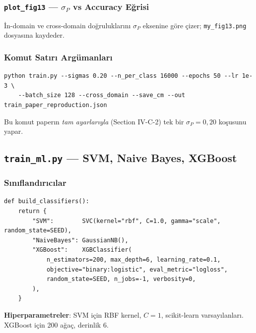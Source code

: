 \documentclass[11pt,a4paper]{article}
\begin{document}
\subsubsection{\texttt{plot\_fig13} — $\sigma_P$ vs Accuracy Eğrisi}
İn-domain ve cross-domain doğruluklarını $\sigma_P$ eksenine göre çizer; \texttt{my\_fig13.png}
dosyasına kaydeder.

\subsubsection{Komut Satırı Argümanları}
\begin{lstlisting}
python train.py --sigmas 0.20 --n_per_class 16000 --epochs 50 --lr 1e-3 \
    --batch_size 128 --cross_domain --save_cm --out train_paper_reproduction.json
\end{lstlisting}
Bu komut paperın \emph{tam ayarlarıyla} (Section IV-C-2) tek bir $\sigma_P=0{,}20$ koşusunu yapar.

\subsection{\texttt{train\_ml.py} — SVM, Naive Bayes, XGBoost}
\subsubsection{Sınıflandırıcılar}
\begin{lstlisting}
def build_classifiers():
    return {
        "SVM":        SVC(kernel="rbf", C=1.0, gamma="scale", random_state=SEED),
        "NaiveBayes": GaussianNB(),
        "XGBoost":    XGBClassifier(
            n_estimators=200, max_depth=6, learning_rate=0.1,
            objective="binary:logistic", eval_metric="logloss",
            random_state=SEED, n_jobs=-1, verbosity=0,
        ),
    }
\end{lstlisting}
\textbf{Hiperparametreler}: SVM için RBF kernel, $C=1$, scikit-learn varsayılanları.
XGBoost için 200 ağaç, derinlik 6.
\end{document}
